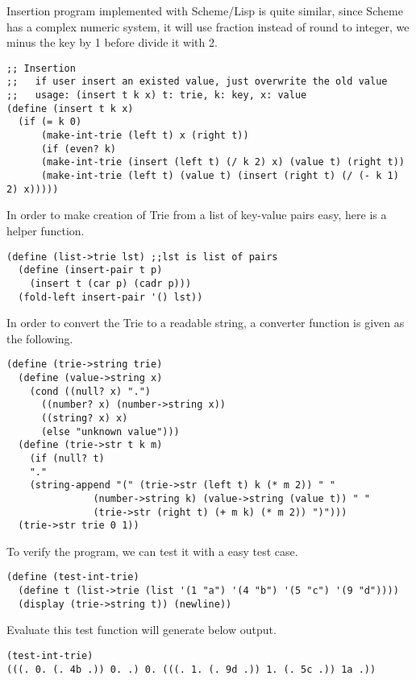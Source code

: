 \documentclass{article}
\begin{document}
Insertion program implemented with Scheme/Lisp is quite similar, since
Scheme has a complex numeric system, it will use fraction instead of
round to integer, we minus the key by 1 before divide it with 2.

\lstset{language=lisp}
\begin{lstlisting}
;; Insertion
;;   if user insert an existed value, just overwrite the old value
;;   usage: (insert t k x) t: trie, k: key, x: value
(define (insert t k x)
  (if (= k 0)
      (make-int-trie (left t) x (right t))
      (if (even? k)
	  (make-int-trie (insert (left t) (/ k 2) x) (value t) (right t))
	  (make-int-trie (left t) (value t) (insert (right t) (/ (- k 1) 2) x)))))
\end{lstlisting}

In order to make creation of Trie from a list of key-value pairs easy,
here is a helper function.

\begin{lstlisting}
(define (list->trie lst) ;;lst is list of pairs
  (define (insert-pair t p)
    (insert t (car p) (cadr p)))
  (fold-left insert-pair '() lst))
\end{lstlisting}

In order to convert the Trie to a readable string, a converter
function is given as the following.

\begin{lstlisting}
(define (trie->string trie)
  (define (value->string x)
    (cond ((null? x) ".")
	  ((number? x) (number->string x))
	  ((string? x) x)
	  (else "unknown value")))
  (define (trie->str t k m)
    (if (null? t)
	"."
	(string-append "(" (trie->str (left t) k (* m 2)) " "
		       (number->string k) (value->string (value t)) " "
		       (trie->str (right t) (+ m k) (* m 2)) ")")))
  (trie->str trie 0 1))
\end{lstlisting}

To verify the program, we can test it with a easy test case.

\begin{lstlisting}
(define (test-int-trie)
  (define t (list->trie (list '(1 "a") '(4 "b") '(5 "c") '(9 "d"))))
  (display (trie->string t)) (newline))
\end{lstlisting}

Evaluate this test function will generate below output.

\begin{lstlisting}
(test-int-trie)
(((. 0. (. 4b .)) 0. .) 0. (((. 1. (. 9d .)) 1. (. 5c .)) 1a .))
\end{lstlisting}
\end{document}
